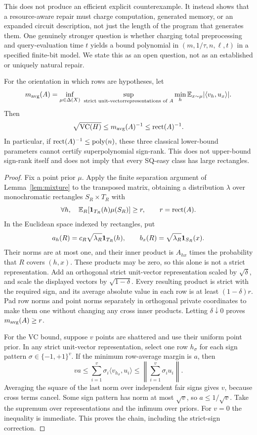 This does not produce an efficient explicit counterexample. It instead shows that a resource-aware repair must charge computation, generated memory, or an expanded circuit description, not just the length of the program that generates them. One genuinely stronger question is whether charging total preprocessing and query-evaluation time $t$ yields a bound polynomial in $(m,1/\tau,n,\ell,t)$ in a specified finite-bit model. We state this as an open question, not as an established or uniquely natural repair.

\begin{samepage}
\begin{proposition}\label{thm:classicalbarrier}
For the orientation in which rows are hypotheses, let
\[
 m_{\rm avg}(A)=\inf_{\mu\in\Delta(X)}\ 
 \sup_{\substack{\text{strict unit-vector}\text{representations of }A}}
 \min_h\E_{x\sim\mu}|\langle v_h,u_x\rangle|.
\]
Then
\[
 \sqrt{\operatorname{VC}(H)}\le m_{\rm avg}(A)^{-1}\le\operatorname{rect}(A)^{-1}.
\]
In particular, if $\operatorname{rect}(A)^{-1}\le\operatorname{poly}(n)$, these three classical lower-bound parameters cannot certify superpolynomial sign-rank. This does not upper-bound sign-rank itself and does not imply that every SQ-easy class has large rectangles.
\end{proposition}
\end{samepage}
\begin{proof}
Fix a point prior $\mu$. Apply the finite separation argument of Lemma~\ref{lem:mixture} to the transposed matrix, obtaining a distribution $\lambda$ over monochromatic rectangles $S_R\times T_R$ with
\[
 \forall h,\quad\mathbb E_R[\mathbf 1_{T_R}(h)\mu(S_R)]\ge r,
 \qquad r=\operatorname{rect}(A).
\]
In the Euclidean space indexed by rectangles, put
\[
 a_h(R)=c_R\sqrt{\lambda_R}\mathbf 1_{T_R}(h),\qquad
 b_x(R)=\sqrt{\lambda_R}\mathbf 1_{S_R}(x).
\]
Their norms are at most one, and their inner product is $A_{hx}$ times the probability that $R$ covers $(h,x)$. These products may be zero, so this alone is not a strict representation. Add an orthogonal strict unit-vector representation scaled by $\sqrt\delta$, and scale the displayed vectors by $\sqrt{1-\delta}$. Every resulting product is strict with the required sign, and its average absolute value in each row is at least $(1-\delta)r$. Pad row norms and point norms separately in orthogonal private coordinates to make them one without changing any cross inner products. Letting $\delta\downarrow0$ proves $m_{\rm avg}(A)\ge r$.

For the VC bound, suppose $v$ points are shattered and use their uniform point prior. In any strict unit-vector representation, select one row $h_\sigma$ for each sign pattern $\sigma\in\{-1,+1\}^v$. If the minimum row-average margin is $a$, then
\[
 va\le\sum_{i=1}^v\sigma_i\langle v_{h_\sigma},u_i\rangle
 \le\left\|\sum_{i=1}^v\sigma_i u_i\right\|.
\]
Averaging the square of the last norm over independent fair signs gives $v$, because cross terms cancel. Some sign pattern has norm at most $\sqrt v$, so $a\le1/\sqrt v$. Take the supremum over representations and the infimum over priors. For $v=0$ the inequality is immediate. This proves the chain, including the strict-sign correction.
\end{proof}

